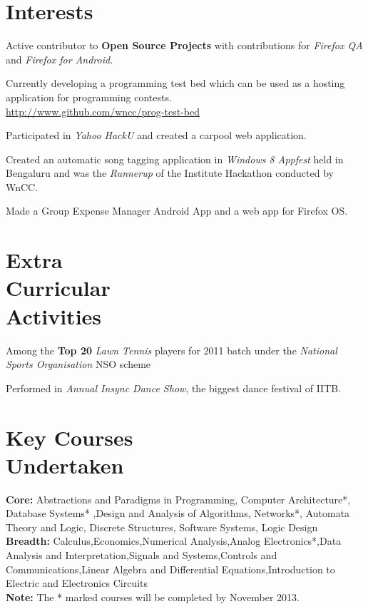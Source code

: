 \documentclass[margin,11pt]{resume}
\begin{document}
\begin{resume}
\section{\mysidestyle Interests}

\begin{list2}
\item Active contributor to \textbf{Open Source Projects} with contributions for \emph{Firefox QA} and \emph{Firefox for Android}.
\item Currently developing a programming test bed which can be used as a hosting application for programming contests.\\ \url{http://www.github.com/wncc/prog-test-bed} 
\item Participated in \emph{Yahoo HackU} and created a carpool web application.
\item Created an automatic song tagging application in \emph{Windows 8 Appfest} held in Bengaluru and was the \emph{Runnerup} of the Institute Hackathon conducted by WnCC.
\item Made a Group Expense Manager Android App and a web app for Firefox OS.
\end{list2}

\section{\mysidestyle Extra \\ Curricular \\ Activities }
\begin{list2}
\item Among the \textbf{Top 20} \emph{Lawn Tennis} players for 2011 batch under the \emph{National Sports Organisation} NSO scheme
\item Performed in \emph{Annual Insync Dance Show}, the biggest dance festival of IITB.
\end{list2}
\section{\mysidestyle Key Courses\\Undertaken}

\textbf{Core:} 
Abstractions and Paradigms in Programming, Computer Architecture*, Database Systems* ,Design and Analysis of Algorithms, Networks*, Automata Theory and Logic, Discrete Structures, Software Systems, Logic Design\\
\textbf{Breadth:} 
Calculus,Economics,Numerical Analysis,Analog Electronics*,Data Analysis and Interpretation,Signals and Systems,Controls and Communications,Linear Algebra and Differential Equations,Introduction to Electric and Electronics Circuits \\
\textbf{Note:} The * marked courses will be completed by November 2013.


\end{resume}
\end{document}
